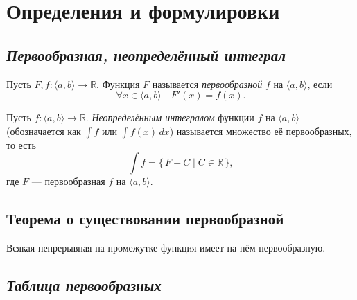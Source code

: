 \section{Определения и формулировки}

\subsection{\itshape Первообразная, неопределённый интеграл}

\begin{ndefinition}
	Пусть $F, f \colon \langle a, b \rangle \to \mathbb{R}$.
	Функция $F$ называется \textit{первообразной} $f$ на $\langle a, b \rangle$, если \[
	\forall x \in \langle a, b \rangle \quad F'(x) = f(x).
	\]
\end{ndefinition}

\begin{ndefinition}
	Пусть $f \colon \langle a, b \rangle \to \mathbb{R}$.
	\textit{Неопределённым интегралом} функции $f$ на $\langle a, b \rangle$
	(обозначается как $\int f$ или $\int f(x) \, dx$) называется множество её первообразных,
	то есть \[
	\int f = \{ \, F + C \mid C \in \mathbb{R} \, \},
	\]
	где $F$ --- первообразная $f$ на $\langle a, b \rangle$.
\end{ndefinition}

\subsection{Теорема о существовании первообразной}

\begin{theorem}
	Всякая непрерывная на промежутке функция имеет на нём первообразную.
\end{theorem}

\subsection{\itshape Таблица первообразных}

